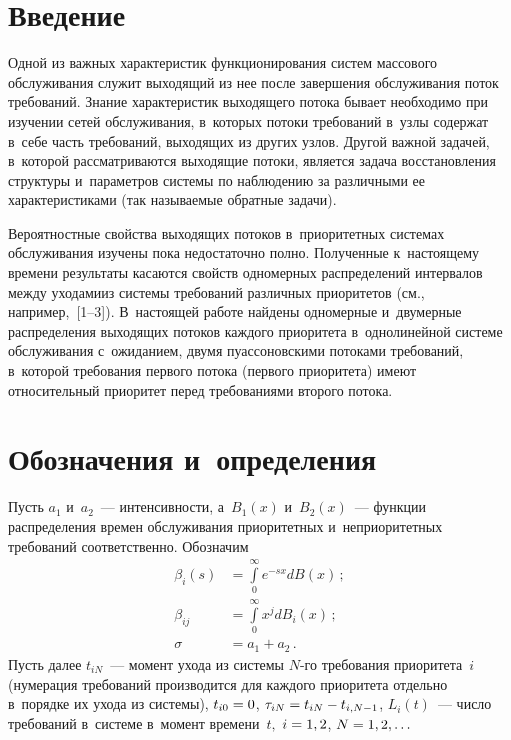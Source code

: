 


\thispagestyle{headings}

\begin{multicols}{2}

\label{st\stat}

\section{Введение} 

Одной из важных характеристик функционирования систем массового обслуживания 
служит выходящий из нее после завершения обслуживания поток требований. 
Знание характеристик выходящего потока бывает необходимо при изучении 
сетей обслуживания, в~которых потоки требований в~узлы содержат в~себе часть 
требований, выходящих из других узлов. Другой важной задачей, в~которой 
рассматриваются выходящие потоки, является задача восстановления 
структуры и~параметров сис\-те\-мы по наблюдению за различными ее 
характеристиками (так называемые обратные задачи).

Вероятностные свойства выходящих потоков в~приоритетных системах 
обслуживания изучены пока недостаточно полно. Полученные к~на\-сто\-яще\-му 
времени результаты касаются свойств одно\-мер\-ных распределений интервалов 
между уходами\linebreak из сис\-те\-мы требований различных приоритетов
 (см., например,~[1--3]). 
В~настоящей работе найде\-ны одномерные и~двумерные распределения выходящих 
потоков каждого приоритета в~однолинейной системе обслуживания с~ожиданием, 
двумя пуассоновскими потоками
требований, в~которой требования первого потока (первого приоритета)
 имеют относительный приоритет перед требованиями второго потока.



\section{Обозначения и~определения}



Пусть $a_1$ и~$a_2$~--- интенсивности, а~$B_1(x)$ и~$B_2(x)$~--- 
функции распределения времен обслуживания приоритетных и~неприоритетных 
требований соответственно.  Обозначим
\begin{align*}
  \beta_i(s)&=\int\limits_0^{\infty}e^{-sx}dB(x)\,;\\ 
  \beta_{ij}&=\int\limits_0^{\infty}x^jdB_i(x)\,;\\
   \sigma&=a_1+a_2\,.
\end{align*}
Пусть далее $t_{iN}$~--- момент ухода из системы \mbox{$N$-го} требования приоритета~$i$ 
(нумерация требований производится для каждого приоритета отдельно в~порядке 
их ухода из системы), $t_{i0}\hm=0$, $\tau_{iN}\hm=t_{iN}\hm-t_{i,N-1}$, $L_i(t)$~--- 
число требований в~системе в~момент времени~$t,$
$i\hm=1,2$, $N\hm=1,2,\ldots$


\end{multicols}

